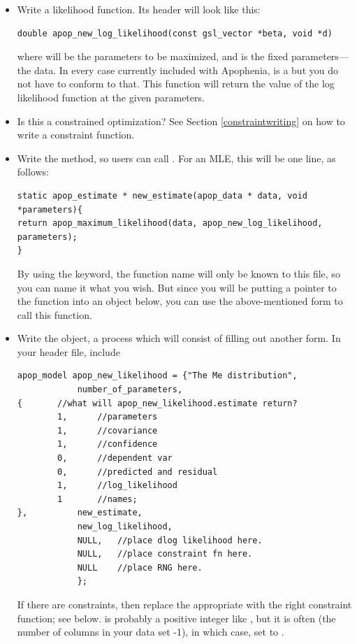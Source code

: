 \begin{itemize}
\item Write a likelihood function. Its header will look like this:
\begin{lstlisting}
double apop_new_log_likelihood(const gsl_vector *beta, void *d)
\end{lstlisting}
where  will be the parameters to be maximized, and  is the fixed parameters---the data. In every case currently included
with Apophenia,  is a  but you do not have to conform
to that. This function will return the value of the log likelihood function at the given parameters.

\item Is this a constrained optimization? See Section
\ref{constraintwriting} on how to write a constraint function.

\item Write the  method, so users can call 
. For an MLE, this will be one line,
as follows:
\begin{lstlisting}
static apop_estimate * new_estimate(apop_data * data, void *parameters){
return apop_maximum_likelihood(data, apop_new_log_likelihood, parameters);
}
\end{lstlisting}
By using the  keyword, the function name will only be
known to this file, so you can name it what you wish.  But since you
will be putting a pointer to the function into an object below, you
can use the above-mentioned 
form to call this function. 


\item Write the object, a process which will consist of filling out
another form. In your header file, include 
\begin{lstlisting}
apop_model apop_new_likelihood = {"The Me distribution", 
            number_of_parameters, 
{       //what will apop_new_likelihood.estimate return?
        1,      //parameters 
        1,      //covariance
        1,      //confidence
        0,      //dependent var
        0,      //predicted and residual
        1,      //log_likelihood
        1       //names;
},          new_estimate,
            new_log_likelihood, 
            NULL,   //place dlog likelihood here.
            NULL,   //place constraint fn here.
            NULL    //place RNG here.
            };
\end{lstlisting}
If there are constraints, then replace the appropriate  with the right constraint function; see below.
 is probably a positive integer like , but
it is often (the number of columns in your data set -1), in which case,
set  to .


\end{itemize}
